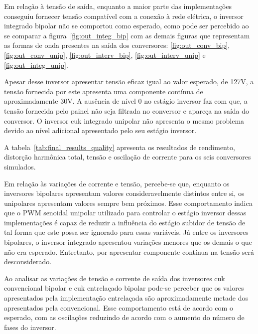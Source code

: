 \documentclass[
	12pt,				%
	openany,
	onseside,
	a4paper,			%
	english,			%
	french,				%
	spanish,			%
	brazil,				%
	]{abntex2}
\begin{document}
Em relação à tensão de saída, enquanto a maior parte das implementações conseguiu fornecer tensão compatível com a conexão à rede elétrica, o inversor integrado bipolar não se comportou como esperado, como pode ser percebido ao se comparar a figura~\ref{fig:out_integ_bip} com as demais figuras que representam as formas de onda presentes na saída dos conversores: \ref{fig:out_conv_bip}, \ref{fig:out_conv_unip}, \ref{fig:out_interv_bip}, \ref{fig:out_interv_unip} e \ref{fig:out_integ_unip}.

Apesar desse inversor apresentar tensão eficaz igual ao valor esperado, de 127V, a tensão fornecida por este apresenta uma componente contínua de aproximadamente 30V. A ausência de nível 0 no estágio inversor faz com que, a tensão fornecida pelo painel não seja filtrada no conversor e apareça na saída do conversor. O inversor cuk integrado unipolar não apresenta o mesmo problema devido ao nível adicional apresentado pelo seu estágio inversor.

A tabela~\ref{tab:final_results_quality} apresenta os resultados de rendimento, distorção harmônica total, tensão e oscilação de corrente para os seis conversores simulados.

Em relação às variações de corrente e tensão, percebe-se que, enquanto os inversores bipolares apresentam valores consideravelmente distintos entre si, os unipolares apresentam valores sempre bem próximos. Esse comportamento indica que o PWM senoidal unipolar utilizado para controlar o estágio inversor dessas implementações é capaz de reduzir a influência do estágio subidor de tensão de tal forma que este possa ser ignorado para essas variáveis. Já entre os inversores bipolares, o inversor integrado apresentou variações menores que os demais o que não era esperado. Entretanto, por apresentar componente contínua na tensão será desconsiderado.

Ao analisar as variações de tensão e corrente de saída dos inversores cuk convencional bipolar e cuk entrelaçado bipolar pode-se perceber que os valores apresentados pela implementação entrelaçada são aproximadamente metade dos apresentados pela convencional. Esse comportamento está de acordo com o esperado, com as oscilações reduzindo de acordo com o aumento do número de fases do inversor.
\end{document}
